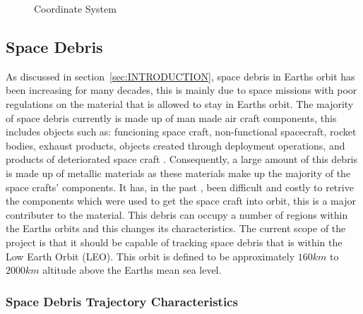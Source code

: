 \documentclass[11pt]{witseiepaper}
\begin{document}
\begin{figure}
\caption{Coordinate System}
\label{fig:CoordinateSystem}
\end{figure}

\subsection{Space Debris} \label{sec:SpaceDebris}
As discussed in section~\ref{sec:INTRODUCTION}, space debris in Earths orbit has been increasing for many decades, this is mainly due to space missions with poor regulations on the material that is allowed to stay in Earths orbit.
The majority of space debris currently is made up of man made air craft components, this includes objects such as: funcioning space craft, non-functional spacecraft, rocket bodies, exhaust products, objects created through deployment operations, and products of deteriorated space craft \cite{OrbitalDebrisTechnicalAssessment}.
Consequently, a large amount of this debris is made up of metallic materials as these materials make up the majority of the space crafts' components.
It has, in the past \cite{Spacex}, been difficult and costly to retrive the components which were used to get the space craft into orbit, this is a major contributer to the material.
This debris can occupy a number of regions within the Earths orbits and this changes its characteristics.
The current scope of the project is that it should be capable of tracking space debris that is within the Low Earth Orbit (LEO). This orbit is defined to be approximately $160 km$ to $2000 km$ altitude above the Earths mean sea level.


\subsubsection{Space Debris Trajectory Characteristics} \label{sec:SpaceDebrisTrajectoryCharacteristics}
\end{document}

